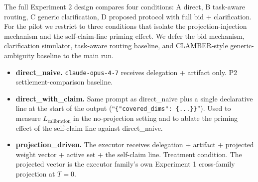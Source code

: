 The full Experiment 2 design compares four conditions: A direct, B task-aware routing, C generic clarification, D proposed protocol with full bid + clarification. For the pilot we restrict to three conditions that isolate the projection-injection mechanism and the self-claim-line priming effect. We defer the bid mechanism, clarification simulator, task-aware routing baseline, and CLAMBER-style generic-ambiguity baseline to the main run.

\begin{itemize}
    \item \textbf{direct\_naive.} \texttt{claude-opus-4-7} receives delegation + artifact only. P2 settlement-comparison baseline.
    \item \textbf{direct\_with\_claim.} Same prompt as direct\_naive plus a single declarative line at the start of the output (``\texttt{\{"covered\_dims": \{...\}\}}''). Used to measure $L_{\text{calibration}}$ in the no-projection setting and to ablate the priming effect of the self-claim line against direct\_naive.
    \item \textbf{projection\_driven.} The executor receives delegation + artifact + projected weight vector + active set + the self-claim line. Treatment condition. The projected vector is the executor family's own Experiment 1 cross-family projection at $T = 0$.
\end{itemize}

